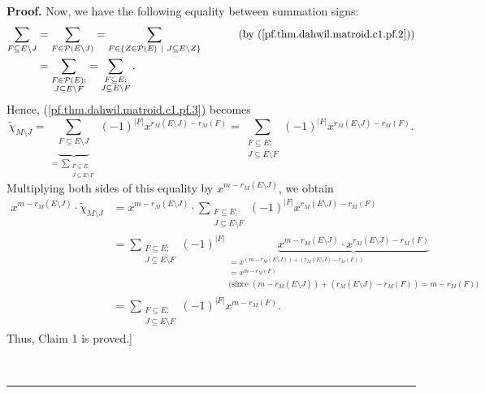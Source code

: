 \documentclass[numbers=enddot,12pt,final,onecolumn,notitlepage]{scrartcl}%
\theoremstyle{definition}
\newenvironment{proof}[1][Proof]{\noindent\textbf{#1.} }{\ \rule{0.5em}{0.5em}}
\newenvironment{verlong}{}{}
\let\sumnonlimits\sum
\renewcommand{\sum}{\sumnonlimits\limits}
\begin{document}
\begin{verlong}
\begin{proof}
Now, we have the following equality between summation signs:%
\begin{align*}
\sum_{F\subseteq E\setminus J}  &  =\sum_{F\in\mathcal{P}\left(  E\setminus
J\right)  }=\sum_{F\in\left\{  Z\in\mathcal{P}\left(  E\right)  \ \mid
\ J\subseteq E\setminus Z\right\}  }\ \ \ \ \ \ \ \ \ \ \left(  \text{by
(\ref{pf.thm.dahwil.matroid.c1.pf.2})}\right) \\
&  =\sum_{\substack{F\in\mathcal{P}\left(  E\right)  ;\\J\subseteq E\setminus
F}}=\sum_{\substack{F\subseteq E;\\J\subseteq E\setminus F}}.
\end{align*}
Hence, (\ref{pf.thm.dahwil.matroid.c1.pf.3}) becomes%
\[
\widetilde{\chi}_{M\setminus J}=\underbrace{\sum_{F\subseteq E\setminus J}%
}_{=\sum_{\substack{F\subseteq E;\\J\subseteq E\setminus F}}}\left(
-1\right)  ^{\left\vert F\right\vert }x^{r_{M}\left(  E\setminus J\right)
-r_{M}\left(  F\right)  }=\sum_{\substack{F\subseteq E;\\J\subseteq E\setminus
F}}\left(  -1\right)  ^{\left\vert F\right\vert }x^{r_{M}\left(  E\setminus
J\right)  -r_{M}\left(  F\right)  }.
\]
Multiplying both sides of this equality by $x^{m-r_{M}\left(  E\setminus
J\right)  }$, we obtain
\begin{align*}
x^{m-r_{M}\left(  E\setminus J\right)  }\cdot\widetilde{\chi}_{M\setminus J}
&  =x^{m-r_{M}\left(  E\setminus J\right)  }\cdot\sum_{\substack{F\subseteq
E;\\J\subseteq E\setminus F}}\left(  -1\right)  ^{\left\vert F\right\vert
}x^{r_{M}\left(  E\setminus J\right)  -r_{M}\left(  F\right)  }\\
&  =\sum_{\substack{F\subseteq E;\\J\subseteq E\setminus F}}\left(  -1\right)
^{\left\vert F\right\vert }\underbrace{x^{m-r_{M}\left(  E\setminus J\right)
}\cdot x^{r_{M}\left(  E\setminus J\right)  -r_{M}\left(  F\right)  }%
}_{\substack{=x^{\left(  m-r_{M}\left(  E\setminus J\right)  \right)  +\left(
r_{M}\left(  E\setminus J\right)  -r_{M}\left(  F\right)  \right)
}\\=x^{m-r_{M}\left(  F\right)  }\\\text{(since }\left(  m-r_{M}\left(
E\setminus J\right)  \right)  +\left(  r_{M}\left(  E\setminus J\right)
-r_{M}\left(  F\right)  \right)  =m-r_{M}\left(  F\right)  \text{)}}}\\
&  =\sum_{\substack{F\subseteq E;\\J\subseteq E\setminus F}}\left(  -1\right)
^{\left\vert F\right\vert }x^{m-r_{M}\left(  F\right)  }.
\end{align*}
Thus, Claim 1 is proved.]


\end{proof}
\end{verlong}
\end{document}
